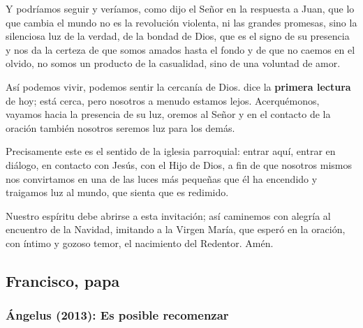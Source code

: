 \begin{body}
					Y podríamos seguir y veríamos, como dijo el Señor en la respuesta a Juan, que lo que cambia el mundo no es la revolución violenta, ni las grandes promesas, sino la silenciosa luz de la verdad, de la bondad de Dios, que es el signo de su presencia y nos da la certeza de que somos amados hasta el fondo y de que no caemos en el olvido, no somos un producto de la casualidad, sino de una voluntad de amor.
					
					Así podemos vivir, podemos sentir la cercanía de Dios.  dice la \textbf{primera lectura} de hoy; está cerca, pero nosotros a menudo estamos lejos. Acerquémonos, vayamos hacia la presencia de su luz, oremos al Señor y en el contacto de la oración también nosotros seremos luz para los demás.
					
					Precisamente este es el sentido de la iglesia parroquial: entrar aquí, entrar en diálogo, en contacto con Jesús, con el Hijo de Dios, a fin de que nosotros mismos nos convirtamos en una de las luces más pequeñas que él ha encendido y traigamos luz al mundo, que sienta que es redimido.
					
					Nuestro espíritu debe abrirse a esta invitación; así caminemos con alegría al encuentro de la Navidad, imitando a la Virgen María, que esperó en la oración, con íntimo y gozoso temor, el nacimiento del Redentor. Amén.
				\end{body}
			
			
		\newsection 			

		\subsection{Francisco, papa}

			\subsubsection{Ángelus (2013): Es posible recomenzar}
				
